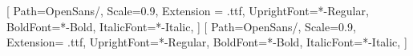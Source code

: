 \setsansfont{OpenSans}[
    Path=OpenSans/,
    Scale=0.9,
    Extension = .ttf,
    UprightFont=*-Regular,
    BoldFont=*-Bold,
    ItalicFont=*-Italic,
    ]
\setmainfont{OpenSans}[
    Path=OpenSans/,
    Scale=0.9,
    Extension= .ttf,
    UprightFont=*-Regular,
    BoldFont=*-Bold,
    ItalicFont=*-Italic,
    ]

\renewcommand{\figurename}{\MakeUppercase{\bfseries FIGURE}}
\renewcommand{\tablename}{\MakeUppercase{\bfseries TABLE}}





\makeatletter
\renewcommand{\maketitle}{
    \begin{center}
    \Huge\textbf{\@title} \\[.5cm]  %
    \Large\textbf{\@subtitle} \\[.5cm]  %
    \textbf{\@date} \\[.5cm]  %
    \end{center}
    \pagenumbering{arabic}
}
\makeatother




